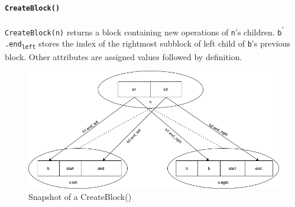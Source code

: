 \documentclass[10pt]{article}
\theoremstyle{definition}
\begin{document}
\paragraph{\texttt{CreateBlock()}} \texttt{CreateBlock(n)} returns a block containing new operations of \texttt{n}'s children. \texttt{b\textsuperscript{$\prime$}.end\textsubscript{left}} stores the index of the rightmost subblock of left child of \texttt{b}'s previous block. Other attributes are assigned values followed by definition.
\begin{figure}[hbt]
  \center\includegraphics[width=5.5in]{pics/createblock}
  \caption{\label{fig::createBlock}Snapshot of a CreateBlock()}
\end{figure}



\pagebreak
\end{document}
